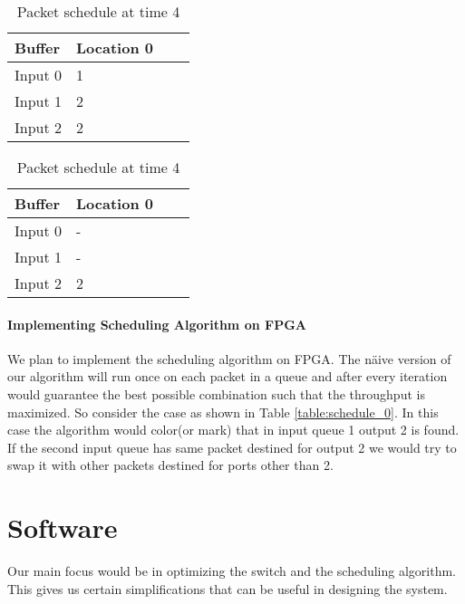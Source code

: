 \documentclass[twoside,12pt,fleqn]{book} %
\begin{document}
\begin{table}
\parbox{.45\linewidth}{
\centering
    \begin{tabular}{| l | l | l | l |}
    \hline
    Buffer & Location 0\\ \hline
    Input 0 & 1\\ \hline
    Input 1 & 2 \\ \hline
    Input 2 & 2\\ \hline
    \end{tabular}
    \caption{Packet schedule at time 3}
	\label{table:schedule_3}}
\hfill
\parbox{.45\linewidth}{
\centering
    \begin{tabular}{| l | l | l | l |}
    \hline
    Buffer & Location 0\\ \hline
    Input 0 & -\\ \hline
    Input 1 & -\\ \hline
    Input 2 & 2\\ \hline
    \end{tabular}
    \caption{Packet schedule at time 4}
	\label{table:schedule_4}}
\end{table}
\newpage
\subsubsection{Implementing Scheduling Algorithm on FPGA}
We plan to implement the scheduling algorithm on FPGA. The n{\"a}ive version of our algorithm will run once on each packet in a queue and after every iteration would guarantee the best possible combination such that the throughput is maximized. So consider the case as shown in Table \ref{table:schedule_0}. In this case the algorithm would color(or mark) that in input queue 1 output 2 is found. If the second input queue has same packet destined for output 2 we would try to swap it with other packets destined for ports other than 2.

\chapter{Software}
Our main focus would be in optimizing the switch and the scheduling algorithm. This gives us certain simplifications that can be useful in designing the system.
\end{document}
